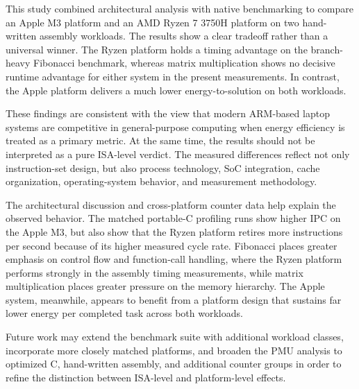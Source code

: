 \documentclass{tcsa}
\begin{document}
This study combined architectural analysis with native benchmarking to compare an
Apple M3 platform and an AMD Ryzen 7 3750H platform on two hand-written assembly
workloads. The results show a clear tradeoff rather than a universal winner. The
Ryzen platform holds a timing advantage on the branch-heavy Fibonacci benchmark,
whereas matrix multiplication shows no decisive runtime advantage for either system
in the present measurements. In contrast, the Apple platform delivers a much lower
energy-to-solution on both workloads.

These findings are consistent with the view that modern ARM-based laptop systems are
competitive in general-purpose computing when energy efficiency is treated as a
primary metric. At the same time, the results should not be interpreted as a pure
ISA-level verdict. The measured differences reflect not only instruction-set design,
but also process technology, SoC integration, cache organization, operating-system
behavior, and measurement methodology.

The architectural discussion and cross-platform counter data help explain the
observed behavior. The matched portable-C profiling runs show higher IPC on the
Apple M3, but also show that the Ryzen platform retires more instructions per
second because of its higher measured cycle rate. Fibonacci places greater
emphasis on control flow and function-call handling, where the Ryzen platform
performs strongly in the assembly timing measurements, while matrix
multiplication places greater pressure on the memory hierarchy. The Apple
system, meanwhile, appears to benefit from a platform design that sustains far
lower energy per completed task across both workloads.

Future work may extend the benchmark suite with additional workload classes,
incorporate more closely matched platforms, and broaden the PMU analysis to
optimized C, hand-written assembly, and additional counter groups in order to
refine the distinction between ISA-level and platform-level effects.

\end{document}
